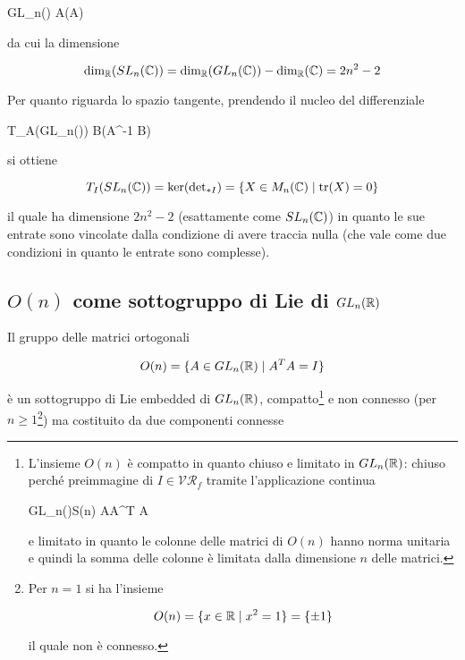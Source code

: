 %
	{GL_{n}(\C)}{\C}%
	{A}{\det(A)}

da cui la dimensione

\begin{equation}
	\dim_{\mathbb{R}}(SL_{n}(\mathbb{C})) = \dim_{\mathbb{R}}(GL_{n}(\mathbb{C})) - \dim_{\mathbb{R}}(\mathbb{C}) = 2 n^{2} - 2
\end{equation}

Per quanto riguarda lo spazio tangente, prendendo il nucleo del differenziale

%
	{T_{A}(GL_{n}(\C))}{\C}%
	{B}{\tr(A^{-1} B)}

si ottiene

\begin{equation}
	T_{I}(SL_{n}(\mathbb{C})) = \ker(\operatorname{det}_{*I}) = \{ X \in M_{n}(\mathbb{C}) \mid \tr(X) = 0 \}
\end{equation}

il quale ha dimensione $ 2 n^{2} - 2 $ (esattamente come $ SL_{n}(\mathbb{C}) $) in quanto le sue entrate sono vincolate dalla condizione di avere traccia nulla (che vale come due condizioni in quanto le entrate sono complesse).

\subsection{$ O(n) $ come sottogruppo di Lie di $ GL_{n}(\mathbb{R}) $}

Il gruppo delle matrici ortogonali

\begin{equation}
	O(n) = \{ A \in GL_{n}(\mathbb{R}) \mid A^{T} A = I \}
\end{equation}

è un sottogruppo di Lie embedded di $ GL_{n}(\mathbb{R}) $, compatto\footnote{%
	L'insieme $ O(n) $ è compatto in quanto chiuso e limitato in $ GL_{n}(\mathbb{R}) $: chiuso perché preimmagine di $ I \in \mathcal{VR}_{f} $ tramite l'applicazione continua
	
		{GL_{n}(\R)}{S(n)}%
		{A}{A^{T} A}
	
	e limitato in quanto le colonne delle matrici di $ O(n) $ hanno norma unitaria e quindi la somma delle colonne è limitata dalla dimensione $ n $ delle matrici.%
} e non connesso (per $ n \geqslant 1 $\footnote{%
	Per $ n=1 $ si ha l'insieme
	
	\begin{equation*}
		O(n) = \{ x \in \mathbb{R} \mid x^{2} = 1 \} = \{ \pm 1 \}
	\end{equation*}
	
	il quale non è connesso.%
}) ma costituito da due componenti connesse


